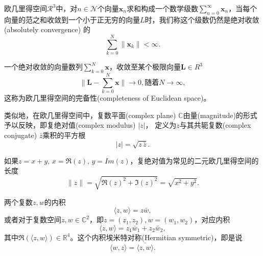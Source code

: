 欧几里得空间$\mathcal{R}^3$中，对$n \in \mathcal{N}$个向量$\bm{x}_n$求和构成一个数学级数$\sum_{n=0}^{\infty} \bm{x}_n$，当每个向量的范之和收敛到一个小于正无穷的向量$L$时，我们称这个级数仍然是绝对收敛(absolutely convergence) 的
\begin{equation*}
  \sum_{k=0}^{N} \| \bm{x}_k \| < \infty.
\end{equation*}

一个绝对收敛的向量数列$\sum_{k=0}^{N} \bm{x}$，收敛至某个极限向量$\bm{L} \in R^3$
\begin{equation*}
  \Big\| \bm{L} -  \sum_{k=0}^{N} \bm{x}\Big\| \rightarrow 0, \text{随着} N \rightarrow \infty,
\end{equation*}
这称为欧几里得空间的完备性(completeness of Euclidean space)\label{def:completeness-space}。

类似地，在欧几里得空间中，复数平面(complex plane) $\mathbb{C}$由量(magnitude)的形式予以反映，即复绝对值(complex modulus) $\left| z \right|$， 定义为$z$与其共轭复数(complex conjugate) $\bar{z}$乘积的平方根
\begin{equation*}
  \left| z \right| = \sqrt{z \, \bar{z}}.
\end{equation*}

如果$z=x+y, \, x=\Re{(z)}, \, y=Im{(z)}$，复绝对值为常见的二元欧几里得空间的长度
\begin{equation*}
  \| z \| = \sqrt{\Re{(z)^2} + \Im{(z)^2}} = \sqrt{x^2 + y^2}.
\end{equation*}

两个复数$z,w$的内积
\begin{equation*}
  \langle z, w \rangle = z \bar{w},
\end{equation*}
或者对于复数空间$z, w \in \mathbb{C}^2$，即$z=(z_1,z_2),w=(w_1,w_2)$，对应内积
\begin{equation*}
  \langle z, w \rangle = z_1 \bar{w}_1 + z_2 \bar{w}_2,
\end{equation*}
其中$\Re(\langle z, w \rangle) \in \mathbb{R}^4$。这个内积埃米特对称(Hermitian symmetric)，即是说
\begin{equation*}
  \langle w,z \rangle = \overline{\langle z,w \rangle}.
\end{equation*}

